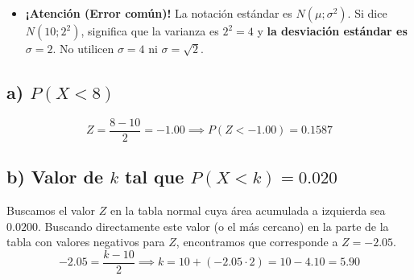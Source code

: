 \documentclass[11pt, a4paper]{article}
\begin{document}
\begin{itemize}
    \item \textbf{¡Atención (Error común)!} La notación estándar es $N(\mu; \sigma^2)$. Si dice $N(10; 2^2)$, significa que la varianza es $2^2=4$ y \textbf{la desviación estándar es $\sigma = 2$}. No utilicen $\sigma = 4$ ni $\sigma = \sqrt{2}$.
\end{itemize}

\subsection*{a) $P(X < 8)$}
\begin{equation*}
Z = \frac{8 - 10}{2} = -1.00 \implies P(Z < -1.00) = 0.1587
\end{equation*}
\begin{center}
\end{center}

\subsection*{b) Valor de $k$ tal que $P(X < k) = 0.020$}
Buscamos el valor $Z$ en la tabla normal cuya área acumulada a izquierda sea $0.0200$. 
Buscando directamente este valor (o el más cercano) en la parte de la tabla con valores negativos para $Z$, encontramos que corresponde a $Z = -2.05$.
\begin{equation*}
-2.05 = \frac{k - 10}{2} \implies k = 10 + (-2.05 \cdot 2) = 10 - 4.10 = 5.90
\end{equation*}
\begin{center}
\end{center}
\end{document}
